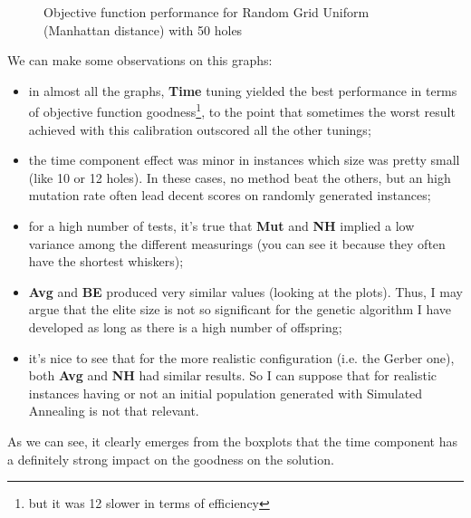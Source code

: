 \begin{figure}[H]
\begin{minipage}{.5\linewidth}
\end{minipage}%
\begin{minipage}{.5\linewidth}
\centering
{}
\end{minipage}\par\medskip

\caption{Objective function performance for Random Grid Uniform (Manhattan
  distance) with 50 holes}
\label{fig:obj-fixed}
\end{figure}

We can make some observations on this graphs:

\begin{itemize}
  \item in almost all the graphs, \textbf{Time} tuning yielded the best
    performance in terms of objective function goodness\footnote{but it was 12
    slower in terms of efficiency}, to the point that sometimes the worst
    result achieved with this calibration outscored all the other tunings;
  \item the time component effect was minor in instances which size was pretty
    small (like 10 or 12 holes). In these cases, no method beat the
    others, but an high mutation rate often lead decent scores on randomly
    generated instances;
  \item for a high number of tests, it's true that \textbf{Mut} and
    \textbf{NH} implied a low variance among the different measurings (you can
    see it because they often have the shortest whiskers);
  \item \textbf{Avg} and \textbf{BE} produced very similar values (looking at
    the plots). Thus, I may argue that the elite size is not so significant
    for the genetic algorithm I have developed as long as there is a high
    number of offspring;
  \item it's nice to see that for the more realistic configuration (i.e. the
    Gerber one), both \textbf{Avg} and \textbf{NH} had similar results. So I
    can suppose that for realistic instances having or not an initial
    population generated with Simulated Annealing is not that relevant.
\end{itemize}

As we can see, it clearly emerges from the boxplots that the time component
has a definitely strong impact on the goodness on the solution.
